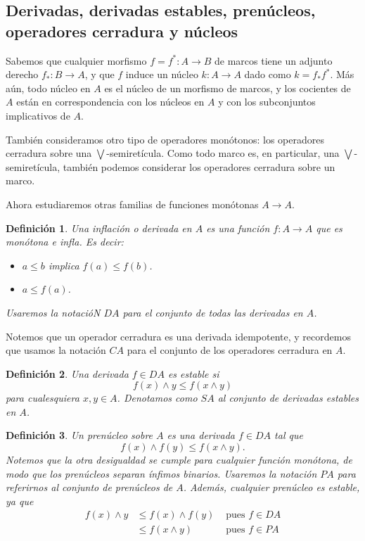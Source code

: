 \documentclass[12pt,letterpaper,titlepage]{article}
\newtheorem*{defn}{Definición}
\theoremstyle{definition}
\newcommand\Sup{\bigvee}
\renewcommand\inf{\wedge}
\newcommand\<{\langle}
\renewcommand\>{\rangle}
\begin{document}
\subsection{Derivadas, derivadas estables, prenúcleos, operadores cerradura y núcleos}

Sabemos que cualquier morfismo $f=f^*:A\to B$ de marcos tiene
un adjunto derecho $f_*:B\to A$, y que $f$ induce un núcleo
$k:A\to A$ dado como $k=f_*f^*$.
Más aún, todo núcleo en $A$ es el núcleo de un morfismo de
marcos, y los cocientes de $A$ están en correspondencia con
los núcleos en $A$ y con los subconjuntos implicativos de $A$.

También consideramos otro tipo de operadores monótonos:
los operadores cerradura sobre una $\Sup$-semiretícula.
Como todo marco es, en particular, una $\Sup$-semiretícula, también
podemos considerar los operadores cerradura sobre un marco.

Ahora estudiaremos otras familias de funciones monótonas $A\to A$.

\begin{defn}
  Una inflación o derivada en $A$ es una función $f:A\to A$ que
  es monótona e infla.
  Es decir:
  \begin{itemize}
    \item $a\leq b$ implica $f(a) \leq f(b)$.
    \item $a\leq f(a)$.
  \end{itemize}
  Usaremos la notacióN $DA$ para el conjunto de todas las
  derivadas en $A$.
\end{defn}
Notemos que un operador cerradura es una derivada idempotente, y
recordemos que usamos la notación $CA$ para el conjunto de los 
operadores cerradura en $A$.

\begin{defn}
  Una derivada $f\in DA$ es \emph{estable} si
  \[
    f(x)\inf y \leq f(x\inf y)
  \]
  para cualesquiera $x,y\in A$.
  Denotamos como $SA$ al conjunto de derivadas estables en $A$.
\end{defn}

\begin{defn}
  Un prenúcleo sobre $A$ es una derivada $f\in DA$ tal que
  \[
    f(x)\inf f(y) \leq f(x\inf y)
  .\]
  Notemos que la otra desigualdad se cumple para cualquier
  función monótona, de modo que los prenúcleos separan ínfimos
  binarios.
  Usaremos la notación $PA$ para referirnos al conjunto de
  prenúcleos de $A$.
  Además, cualquier prenúcleo es estable, ya que
  \begin{align*}
    f(x) \inf y
    &\leq f(x) \inf f(y) & \text{ pues $f\in DA$} \\
    &\leq f(x\inf y) & \text{ pues $f\in PA$}
  \end{align*}
\end{defn}
\end{document}
